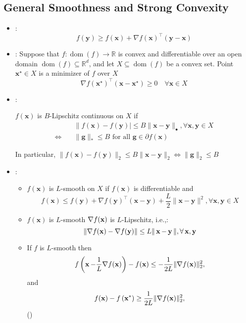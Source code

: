 \subsection*{General Smoothness and Strong Convexity}
\begin{itemize}[leftmargin=*]
    \item {}: 
    $$f(\mathbf{y}) \geq f(\mathbf{x})+\nabla f(\mathbf{x})^{\top}(\mathbf{y}-\mathbf{x})
    $$
    
    \item {}: Suppose that $f: \operatorname{dom}(f) \rightarrow \mathbb{R}$ is convex and differentiable over an open domain $\operatorname{dom}(f) \subseteq \mathbb{R}^{d}$, and let $X \subseteq \operatorname{dom}(f)$ be a convex set. Point $\mathbf{x}^{\star} \in X$ is a minimizer of $f$ over $X$ 
$$
\nabla f\left(\mathbf{x}^{\star}\right)^{\top}\left(\mathbf{x}-\mathbf{x}^{\star}\right) \geq 0 \quad \forall \mathbf{x} \in X
$$

    \item {}: 

$f(\mathbf{x})$ is $B$-Lipschitz continuous on $X$ if
$$
\begin{aligned}
    &\|f(\mathbf{x})-f(\mathbf{y})| \leq B\|\mathbf{x}-\mathbf{y}\|_\bullet , \forall \mathbf{x}, \mathbf{y} \in X \\
    \iff \quad & \|\mathbf{g}\|_{*} \leq B \text{ for all } \mathbf{g} \in \partial f(\mathbf{x})
\end{aligned}
$$

    In particular, $\|f(\mathbf{x})-f(\mathbf{y})\|_2 \leq B\|\mathbf{x}-\mathbf{y}\|_2 \iff  \|\mathbf{g}\|_{2} \leq B$
    \item {}: 
        \begin{itemize}[leftmargin=*]
        \item $f(\mathbf{x})$ is $L$-smooth on $X$ if $f(\mathbf{x})$ is differentiable and
$$
f(\mathbf{x}) \leq f(\mathbf{y})+\nabla f(\mathbf{y})^{\top}(\mathbf{x}-\mathbf{y})+\frac{L}{2}\|\mathbf{x}-\mathbf{y}\|^{2}, \forall \mathbf{x}, \mathbf{y} \in X
$$
        \item $f(\mathbf{x})$ is $L$-smooth  $\nabla f(\operatorname{\boldsymbol{\mathbf{x}}})$ is $L$-Lipschitz, i.e.,:
    $$
\|\nabla f(\operatorname{\boldsymbol{\mathbf{x}}})-\nabla f(\operatorname{\boldsymbol{\mathbf{y}}})\| \leq L\|\operatorname{\boldsymbol{\mathbf{x}}}-\operatorname{\boldsymbol{\mathbf{y}}}\|, \forall \operatorname{\boldsymbol{\mathbf{x}}}, \operatorname{\boldsymbol{\mathbf{y}}}
$$
        \item If $f$ is $L$-smooth then
$$
f\left(\operatorname{\boldsymbol{\mathbf{x}}}-\frac{1}{L} \nabla f(\operatorname{\boldsymbol{\mathbf{x}}})\right)-f(\operatorname{\boldsymbol{\mathbf{x}}}) \leq-\frac{1}{2 L}\|\nabla f(\operatorname{\boldsymbol{\mathbf{x}}})\|_{2}^{2},
$$
and
$$
f(\operatorname{\boldsymbol{\mathbf{x}}}) - f\left(\operatorname{\boldsymbol{\mathbf{x}}}^{*}\right) \geq \frac{1}{2 L}\|\nabla f(\operatorname{\boldsymbol{\mathbf{x}}})\|_{2}^{2},
$$
    ()
    

\end{itemize}
\end{itemize}
